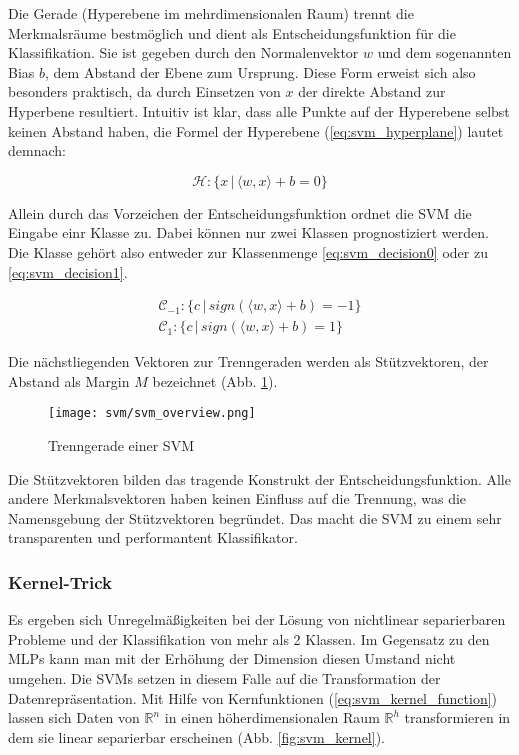 Die Gerade (Hyperebene im mehrdimensionalen Raum) trennt die Merkmalsräume bestmöglich und dient als Entscheidungsfunktion für die Klassifikation. Sie ist gegeben durch den Normalenvektor $w$ und dem sogenannten Bias $b$, dem Abstand der Ebene zum Ursprung. Diese Form erweist sich also besonders praktisch, da durch Einsetzen von $x$ der direkte Abstand zur Hyperbene resultiert.
Intuitiv ist klar, dass alle Punkte auf der Hyperebene selbst keinen Abstand haben, die Formel der Hyperebene (\ref{eq:svm_hyperplane}) lautet demnach: 
 
\begin{equation}
\label{eq:svm_hyperplane}
    \mathcal{H}: \{ x \,|\, \langle w,x \rangle + b = 0 \}
\end{equation}
 
Allein durch das Vorzeichen der Entscheidungsfunktion ordnet die SVM die Eingabe einr Klasse zu. Dabei können nur zwei Klassen  prognostiziert werden. Die Klasse gehört also entweder zur Klassenmenge \ref{eq:svm_decision0} oder zu \ref{eq:svm_decision1}.

\begin{eqnarray}
    \mathcal{C}_{-1}: \{ c \,|\, sign(\langle w,x \rangle + b) = -1 \} \label{eq:svm_decision0} \\
    \mathcal{C}_1: \{ c \,|\, sign(\langle w,x \rangle + b) = 1 \} \label{eq:svm_decision1}
\end{eqnarray}

Die nächstliegenden Vektoren zur Trenngeraden werden als Stützvektoren, der Abstand als Margin $M$ bezeichnet (Abb. \ref{fig:svm_separator}). 

\begin{figure}[htbp] \centering
    \texttt{[image: svm/svm\_overview.png]}
    \caption{Trenngerade einer SVM}
    \label{fig:svm_separator}
\end{figure}

Die Stützvektoren bilden das tragende Konstrukt der Entscheidungsfunktion. 
Alle andere Merkmalsvektoren haben keinen Einfluss auf die Trennung, was die Namensgebung der Stützvektoren begründet. 
Das macht die SVM zu einem sehr transparenten und performantent Klassifikator. 


\subsubsection{Kernel-Trick}
Es ergeben sich Unregelmäßigkeiten bei der Lösung von nichtlinear separierbaren Probleme und der Klassifikation von mehr als 2 Klassen.
Im Gegensatz zu den MLPs kann man mit der Erhöhung der Dimension diesen Umstand nicht umgehen. 
Die SVMs setzen in diesem Falle auf die Transformation der Datenrepräsentation. 
Mit Hilfe von Kernfunktionen (\ref{eq:svm_kernel_function}) lassen sich Daten von $\mathbb{R}^n$ in einen höherdimensionalen Raum $\mathbb{R}^h$ transformieren in dem sie linear separierbar erscheinen (Abb. \ref{fig:svm_kernel}). 

